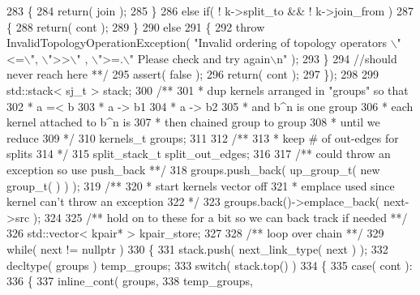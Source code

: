 \begin{DoxyCode}
283         \{
284             return( join );
285         \}
286         \textcolor{keywordflow}{else} \textcolor{keywordflow}{if}( ! k->split\_to && ! k->join\_from )
287         \{
288             return( cont );
289         \}
290         \textcolor{keywordflow}{else}
291         \{
292             throw InvalidTopologyOperationException( \textcolor{stringliteral}{"Invalid ordering of topology operators \(\backslash\)"<=\(\backslash\)", \(\backslash\)">>\(\backslash\)"
      , \(\backslash\)">=.\(\backslash\)" Please check and try again\(\backslash\)n"} );
293         \}
294         \textcolor{comment}{//should never reach here **/}
295         assert( \textcolor{keyword}{false} );
296         \textcolor{keywordflow}{return}( cont );
297     \});
298 
299     std::stack< sj\_t > stack;\textcolor{comment}{}
300 \textcolor{comment}{    /**}
301 \textcolor{comment}{     * dup kernels arranged in "groups" so that}
302 \textcolor{comment}{     * a =< b}
303 \textcolor{comment}{     * a -> b1}
304 \textcolor{comment}{     * a -> b2}
305 \textcolor{comment}{     * and b^n is one group}
306 \textcolor{comment}{     * each kernel attached to b^n is}
307 \textcolor{comment}{     * then chained group to group}
308 \textcolor{comment}{     * until we reduce}
309 \textcolor{comment}{     */}
310     kernels\_t  groups;
311 \textcolor{comment}{}
312 \textcolor{comment}{    /**}
313 \textcolor{comment}{     * keep # of out-edges for splits}
314 \textcolor{comment}{     */}
315     split\_stack\_t split\_out\_edges;
316 \textcolor{comment}{}
317 \textcolor{comment}{    /** could throw an exception so use push\_back **/}
318     groups.push\_back( up\_group\_t( \textcolor{keyword}{new} group\_t( ) ) );\textcolor{comment}{}
319 \textcolor{comment}{    /**}
320 \textcolor{comment}{     * start kernels vector off}
321 \textcolor{comment}{     * emplace used since kernel can't throw an exception}
322 \textcolor{comment}{     */}
323     groups.back()->emplace\_back( next->src );
324 \textcolor{comment}{}
325 \textcolor{comment}{    /** hold on to these for a bit so we can back track if needed **/}
326     std::vector< kpair* > kpair\_store;
327 \textcolor{comment}{}
328 \textcolor{comment}{    /** loop over chain **/}
329     \textcolor{keywordflow}{while}( next != \textcolor{keyword}{nullptr} )
330     \{
331         stack.push( next\_link\_type( next ) );
332         decltype( groups ) temp\_groups;
333         switch( stack.top() )
334         \{
335             \textcolor{keywordflow}{case}( cont ):
336             \{
337                 inline\_cont( groups,
338                              temp\_groups,

\end{DoxyCode}

